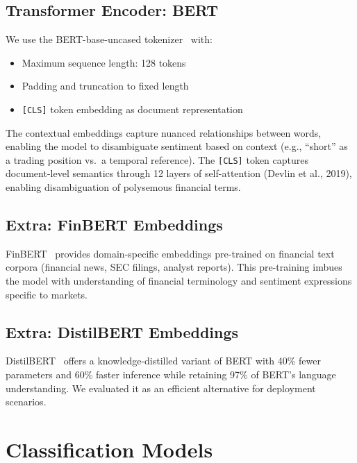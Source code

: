 \documentclass[11pt,a4paper]{article}
\begin{document}
\subsection{Transformer Encoder: BERT}

We use the BERT-base-uncased tokenizer~\cite{devlin2019bert} with:
\begin{itemize}[noitemsep]
    \item Maximum sequence length: 128 tokens
    \item Padding and truncation to fixed length
    \item \texttt{[CLS]} token embedding as document representation
\end{itemize}

The contextual embeddings capture nuanced relationships between words, enabling the model to disambiguate sentiment based on context (e.g., ``short'' as a trading position vs.\ a temporal reference). The \texttt{[CLS]} token captures document-level semantics through 12 layers of self-attention (Devlin et al., 2019), enabling disambiguation of polysemous financial terms.

\subsection{Extra: FinBERT Embeddings}

FinBERT~\cite{araci2019finbert} provides domain-specific embeddings pre-trained on financial text corpora (financial news, SEC filings, analyst reports). This pre-training imbues the model with understanding of financial terminology and sentiment expressions specific to markets.

\subsection{Extra: DistilBERT Embeddings}

DistilBERT~\cite{sanh2019distilbert} offers a knowledge-distilled variant of BERT with 40\% fewer parameters and 60\% faster inference while retaining 97\% of BERT's language understanding. We evaluated it as an efficient alternative for deployment scenarios.

\section{Classification Models}
\end{document}
